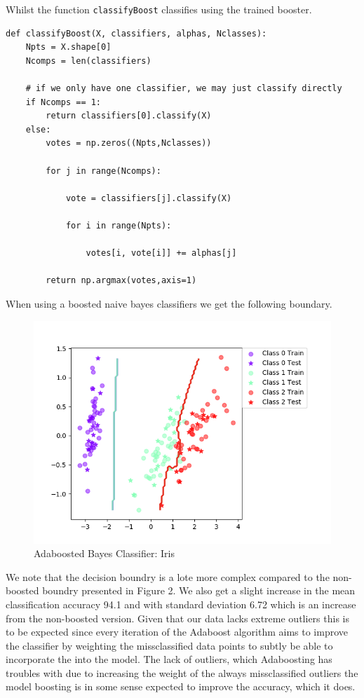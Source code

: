 \documentclass{article}
\begin{document}
Whilst the function \texttt{classifyBoost} classifies using the trained booster.

\begin{lstlisting}
def classifyBoost(X, classifiers, alphas, Nclasses):
    Npts = X.shape[0]
    Ncomps = len(classifiers)

    # if we only have one classifier, we may just classify directly
    if Ncomps == 1:
        return classifiers[0].classify(X)
    else:
        votes = np.zeros((Npts,Nclasses))
        
        for j in range(Ncomps):
            
            vote = classifiers[j].classify(X)
            
            for i in range(Npts):
                
                votes[i, vote[i]] += alphas[j]
            
        return np.argmax(votes,axis=1)
\end{lstlisting}

When using a boosted naive bayes classifiers we get the following boundary.
        
\begin{figure}
    \centering
    \includegraphics[scale = 0.90]{BoostedBayesIrirs.png}
    \caption{Adaboosted Bayes Classifier: Iris}
\end{figure}

We note that the decision boundry is a lote more complex compared to the non-boosted boundry presented in Figure 2. We also get a slight increase in the mean classification accuracy 94.1 and with standard deviation 6.72 which is an increase from the non-boosted version. Given that our data lacks extreme outliers this is to be expected since every iteration of the Adaboost algorithm aims to improve the classifier by weighting the missclassified data points to subtly be able to incorporate the into the model. The lack of outliers, which Adaboosting has troubles with due to increasing the weight of the always missclassified outliers the model boosting is in some sense expected to improve the accuracy, which it does.
\end{document}
